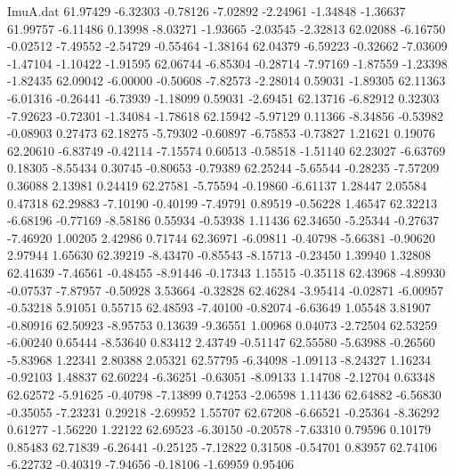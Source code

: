\begin{filecontents}{ImuA.dat}
  61.97429   -6.32303   -0.78126   -7.02892   -2.24961   -1.34848   -1.36637
  61.99757   -6.11486    0.13998   -8.03271   -1.93665   -2.03545   -2.32813
  62.02088   -6.16750   -0.02512   -7.49552   -2.54729   -0.55464   -1.38164
  62.04379   -6.59223   -0.32662   -7.03609   -1.47104   -1.10422   -1.91595
  62.06744   -6.85304   -0.28714   -7.97169   -1.87559   -1.23398   -1.82435
  62.09042   -6.00000   -0.50608   -7.82573   -2.28014    0.59031   -1.89305
  62.11363   -6.01316   -0.26441   -6.73939   -1.18099    0.59031   -2.69451
  62.13716   -6.82912    0.32303   -7.92623   -0.72301   -1.34084   -1.78618
  62.15942   -5.97129    0.11366   -8.34856   -0.53982   -0.08903    0.27473
  62.18275   -5.79302   -0.60897   -6.75853   -0.73827    1.21621    0.19076
  62.20610   -6.83749   -0.42114   -7.15574    0.60513   -0.58518   -1.51140
  62.23027   -6.63769    0.18305   -8.55434    0.30745   -0.80653   -0.79389
  62.25244   -5.65544   -0.28235   -7.57209    0.36088    2.13981    0.24419
  62.27581   -5.75594   -0.19860   -6.61137    1.28447    2.05584    0.47318
  62.29883   -7.10190   -0.40199   -7.49791    0.89519   -0.56228    1.46547
  62.32213   -6.68196   -0.77169   -8.58186    0.55934   -0.53938    1.11436
  62.34650   -5.25344   -0.27637   -7.46920    1.00205    2.42986    0.71744
  62.36971   -6.09811   -0.40798   -5.66381   -0.90620    2.97944    1.65630
  62.39219   -8.43470   -0.85543   -8.15713   -0.23450    1.39940    1.32808
  62.41639   -7.46561   -0.48455   -8.91446   -0.17343    1.15515   -0.35118
  62.43968   -4.89930   -0.07537   -7.87957   -0.50928    3.53664   -0.32828
  62.46284   -3.95414   -0.02871   -6.00957   -0.53218    5.91051    0.55715
  62.48593   -7.40100   -0.82074   -6.63649    1.05548    3.81907   -0.80916
  62.50923   -8.95753    0.13639   -9.36551    1.00968    0.04073   -2.72504
  62.53259   -6.00240    0.65444   -8.53640    0.83412    2.43749   -0.51147
  62.55580   -5.63988   -0.26560   -5.83968    1.22341    2.80388    2.05321
  62.57795   -6.34098   -1.09113   -8.24327    1.16234   -0.92103    1.48837
  62.60224   -6.36251   -0.63051   -8.09133    1.14708   -2.12704    0.63348
  62.62572   -5.91625   -0.40798   -7.13899    0.74253   -2.06598    1.11436
  62.64882   -6.56830   -0.35055   -7.23231    0.29218   -2.69952    1.55707
  62.67208   -6.66521   -0.25364   -8.36292    0.61277   -1.56220    1.22122
  62.69523   -6.30150   -0.20578   -7.63310    0.79596    0.10179    0.85483
  62.71839   -6.26441   -0.25125   -7.12822    0.31508   -0.54701    0.83957
  62.74106   -6.22732   -0.40319   -7.94656   -0.18106   -1.69959    0.95406

\end{filecontents}
